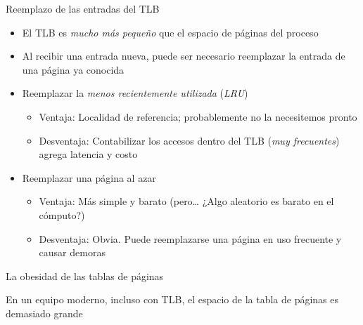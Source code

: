 \documentclass[presentation]{beamer}
\newcommand{\rarrow}{$\rightarrow$\hskip 0.5em}
\begin{document}
\begin{frame}[label={sec:orgbcd1b45}]{Reemplazo de las entradas del TLB}
\begin{itemize}
\item El TLB es \emph{mucho más pequeño} que el espacio de páginas del proceso
\item Al recibir una entrada nueva, puede ser necesario reemplazar la
entrada de una página ya conocida
\item Reemplazar la \emph{menos recientemente utilizada} (\emph{LRU})
\begin{itemize}
\item Ventaja: Localidad de referencia; probablemente no la necesitemos
pronto
\item Desventaja: Contabilizar los accesos dentro del TLB (\emph{muy
frecuentes}) agrega latencia y costo
\end{itemize}
\item Reemplazar una página al azar
\begin{itemize}
\item Ventaja: Más simple y barato (pero\ldots{} ¿Algo aleatorio es barato en
el cómputo?)
\item Desventaja: Obvia. Puede reemplazarse una página en uso frecuente
y causar demoras
\end{itemize}
\end{itemize}
\end{frame}

\begin{frame}[label={sec:org9cd368e}]{La obesidad de las tablas de páginas}
\begin{center}
En un equipo moderno, incluso con TLB, el espacio de la tabla de
páginas es demasiado grande
\end{center}
\end{frame}
\end{document}
